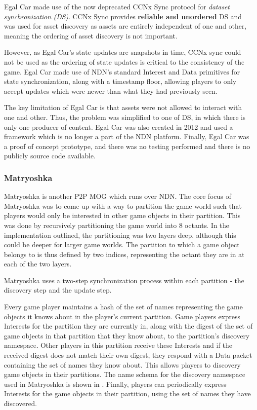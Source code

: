 Egal Car made use of the now deprecated CCNx Sync protocol \cite{ccnx-sync} for \textit{dataset synchronization (DS)}. CCNx Sync provides \textbf{reliable and unordered} DS and was used for asset discovery as assets are entirely independent of one and other, meaning the ordering of asset discovery is not important.

However, as Egal Car's state updates are snapshots in time, CCNx sync could not be used as the ordering of state updates is critical to the consistency of the game. Egal Car made use of NDN's standard Interest and Data primitives for state synchronization, along with a timestamp floor, allowing players to only accept updates which were newer than what they had previously seen.

The key limitation of Egal Car is that assets were not allowed to interact with one and other. Thus, the problem was simplified to one of DS, in which there is only one producer of content. Egal Car was also created in 2012 and used a framework which is no longer a part of the NDN platform. Finally, Egal Car was a proof of concept prototype, and there was no testing performed and there is no publicly source code available. 

\subsubsection*{Matryoshka \cite{ndn-multiplayer-game}}\label{sec:sota:matryoshka}
Matryoshka is another P2P MOG which runs over NDN. The core focus of Matryoshka was to come up with a way to partition the game world such that players would only be interested in other game objects in their partition. This was done by recursively partitioning the game world into 8 octants. In the implementation outlined, the partitioning was two layers deep, although this could be deeper for larger game worlds. The partition to which a game object belongs to is thus defined by two indices, representing the octant they are in at each of the two layers. 

Matryoshka uses a two-step synchronization process within each partition - the discovery step and the update step. 

Every game player maintains a hash of the set of names representing the game objects it knows about in the player's current partition. Game players express Interests for the partition they are currently in, along with the digest of the set of game objects in that partition that they know about, to the partition's discovery namespace. Other players in this partition receive these Interests and if the received digest does not match their own digest, they respond with a Data packet containing the set of names they know about. This allows players to discovery game objects in their partitions. The name schema for the discovery namespace used in Matryoshka is shown in . Finally, players can periodically express Interests for the game objects in their partition, using the set of names they have discovered. 

